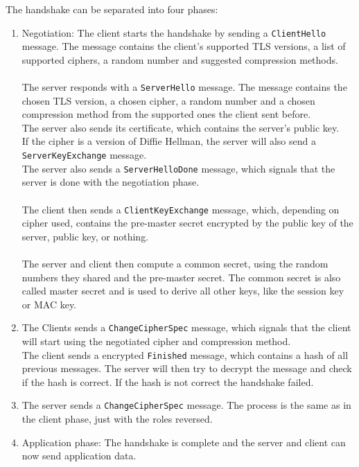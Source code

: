 The handshake can be separated into four phases:
\begin{enumerate}
    \item Negotiation: The client starts the handshake by sending a \texttt{ClientHello} message. The message contains the client's supported TLS versions, a list of supported ciphers, a random number and suggested compression methods.
    \\\\
    The server responds with a \texttt{ServerHello} message. The message contains the chosen TLS version, a chosen cipher, a random number and a chosen compression method from the supported ones the client sent before.
    \\
    The server also sends its certificate, which contains the server's public key.
    \\
    If the cipher is a version of Diffie Hellman, the server will also send a \texttt{ServerKeyExchange} message.
    \\
    The server also sends a \texttt{ServerHelloDone} message, which signals that the server is done with the negotiation phase.
    \\\\
    The client then sends a \texttt{ClientKeyExchange} message, which, depending on cipher used, contains the pre-master secret encrypted by the public key of the server, public key, or nothing.
    \\\\
    The server and client then compute a common secret, using the random numbers they shared and the pre-master secret. The common secret is also called master secret and is used to derive all other keys, like the session key or MAC key.
    
    \item The Clients sends a \texttt{ChangeCipherSpec} message, which signals that the client will start using the negotiated cipher and compression method.
    \\
    The client sends a encrypted \texttt{Finished} message, which contains a hash of all previous messages. The server will then try to decrypt the message and check if the hash is correct. If the hash is not correct the handshake failed.

    \item The server sends a \texttt{ChangeCipherSpec} message. The process is the same as in the client phase, just with the roles reversed.
    
    \item Application phase: The handshake is complete and the server and client can now send application data.
\end{enumerate}